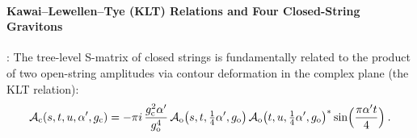 \paragraph*{Kawai--Lewellen--Tye (KLT) Relations and Four Closed-String Gravitons}:
The tree-level S-matrix of closed strings is fundamentally related to the product of two open-string amplitudes via contour deformation in the complex plane (the KLT relation):
\begin{equation}
	\mathcal{A}_{\mathrm{c}}(s,t,u,\alpha',g_{\mathrm{c}}) = -\pi i\,\frac{g_{\mathrm{c}}^{2}\alpha'}{g_{\mathrm{o}}^{4}}\,\mathcal{A}_{\mathrm{o}}\bigl(s,t,\tfrac{1}{4}\alpha',g_{\mathrm{o}}\bigr)\,\mathcal{A}_{\mathrm{o}}\bigl(t,u,\tfrac{1}{4}\alpha',g_{\mathrm{o}}\bigr)^{*}\sin\Bigl(\frac{\pi\alpha't}{4}\Bigr) \:. \label{12.4.29}
\end{equation}
